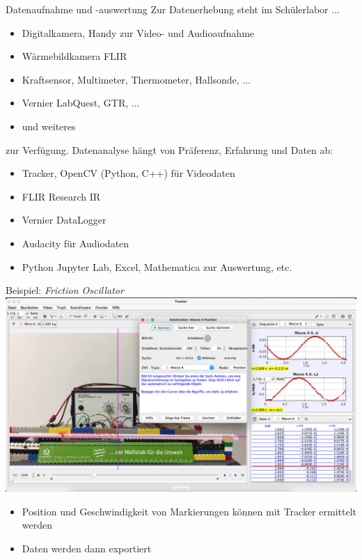\documentclass[9pt]{beamer}
\begin{document}
\begin{frame}{Datenaufnahme und -auswertung}
  Zur Datenerhebung steht im Schülerlabor ...
  \begin{itemize}
    \item Digitalkamera, Handy zur Video- und Audioaufnahme
    \item Wärmebildkamera FLIR
    \item Kraftsensor, Multimeter, Thermometer, Hallsonde, ...
    \item Vernier LabQuest, GTR, ...
    \item und weiteres
  \end{itemize}
  zur Verfügung.
  \vfill
  \pause
  Datenanalyse hängt von Präferenz, Erfahrung und Daten ab:
  \begin{itemize}
    \item Tracker, OpenCV (Python, C++) für Videodaten
    \item FLIR Research IR
    \item Vernier DataLogger
    \item Audacity für Audiodaten
    \item Python Jupyter Lab, Excel, Mathematica zur Auswertung, etc.
  \end{itemize}
\end{frame}

\begin{frame}{Beispiel: \emph{Friction Oscillator}}
  \includegraphics[width=\textwidth]{photos/screenshot}
  \begin{itemize}
    \item Position und Geschwindigkeit von Markierungen können mit Tracker ermittelt werden
    \item Daten werden dann exportiert
  \end{itemize}
\end{frame}
\end{document}
